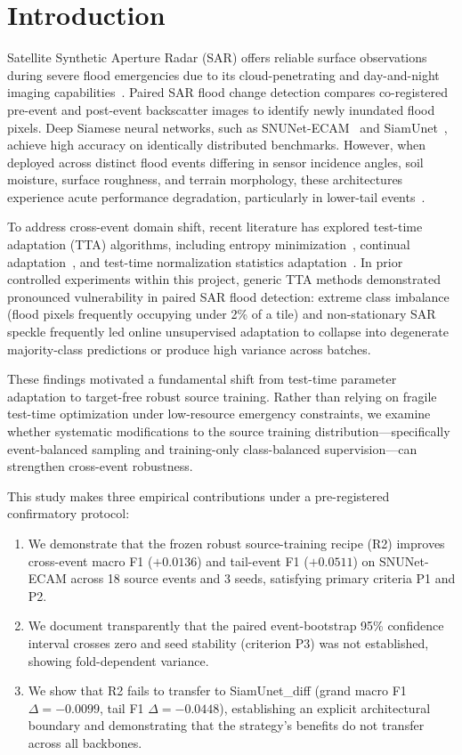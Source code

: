 \documentclass[conference]{IEEEtran}
\begin{document}
\section{Introduction}
Satellite Synthetic Aperture Radar (SAR) offers reliable surface observations during severe flood emergencies due to its cloud-penetrating and day-and-night imaging capabilities~\cite{bountos2023kurosiwo}. Paired SAR flood change detection compares co-registered pre-event and post-event backscatter images to identify newly inundated flood pixels. Deep Siamese neural networks, such as SNUNet-ECAM~\cite{fang2021snunet} and SiamUnet~\cite{daudt2018fully}, achieve high accuracy on identically distributed benchmarks. However, when deployed across distinct flood events differing in sensor incidence angles, soil moisture, surface roughness, and terrain morphology, these architectures experience acute performance degradation, particularly in lower-tail events~\cite{wang2021tent}.

To address cross-event domain shift, recent literature has explored test-time adaptation (TTA) algorithms, including entropy minimization~\cite{wang2021tent}, continual adaptation~\cite{wang2022continual}, and test-time normalization statistics adaptation~\cite{schneider2020improving,li2018revisiting}. In prior controlled experiments within this project, generic TTA methods demonstrated pronounced vulnerability in paired SAR flood detection: extreme class imbalance (flood pixels frequently occupying under 2\% of a tile) and non-stationary SAR speckle frequently led online unsupervised adaptation to collapse into degenerate majority-class predictions or produce high variance across batches.

These findings motivated a fundamental shift from test-time parameter adaptation to target-free robust source training. Rather than relying on fragile test-time optimization under low-resource emergency constraints, we examine whether systematic modifications to the source training distribution—specifically event-balanced sampling and training-only class-balanced supervision—can strengthen cross-event robustness.

This study makes three empirical contributions under a pre-registered confirmatory protocol:
\begin{enumerate}
    \item We demonstrate that the frozen robust source-training recipe (R2) improves cross-event macro F1 ($+0.0136$) and tail-event F1 ($+0.0511$) on SNUNet-ECAM across 18 source events and 3 seeds, satisfying primary criteria P1 and P2.
    \item We document transparently that the paired event-bootstrap 95\% confidence interval crosses zero and seed stability (criterion P3) was not established, showing fold-dependent variance.
    \item We show that R2 fails to transfer to SiamUnet\_diff (grand macro F1 $\Delta = -0.0099$, tail F1 $\Delta = -0.0448$), establishing an explicit architectural boundary and demonstrating that the strategy's benefits do not transfer across all backbones.
\end{enumerate}
\end{document}
